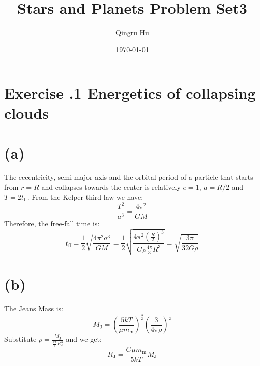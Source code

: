 \documentclass[a4paper,12pt]{article}
\title{\textbf{Stars and Planets Problem Set3}}
\author{Qingru Hu}
\date{\today}
\begin{document}
\maketitle
\section*{\textbf{Exercise \uppercase\expandafter{}.1  Energetics of collapsing clouds}}
\section*{(a)}
The eccentricity, semi-major axis and the orbital period of a particle that starts from $r=R$ and 
collapses towards the center is relatively $e=1$, $a=R/2$ and $T=2t_{\text{ff}}$. From the Kelper 
third law we have:
\begin{equation*}
    \frac{T^2}{a^3} = \frac{4\pi^2}{GM}
\end{equation*}
Therefore, the free-fall time is:
\begin{equation*}
    t_{\text{ff}} = \frac{1}{2} \sqrt{\frac{4\pi^2 a^3}{G M}} 
    = \frac{1}{2} \sqrt{\frac{4\pi^2 (\frac{R}{2})^3}{G \rho \frac{4\pi}{3} R^3}}
    = \sqrt{\frac{3\pi}{32 G\rho}}
\end{equation*}

\section*{(b)}
The Jeans Mass is:
\begin{equation*}
    M_\text{J} = (\frac{5kT}{\mu m_\text{m}})^{\frac{3}{2}} (\frac{3}{4\pi \rho})^{\frac{1}{2}}
\end{equation*}
Substitute $\rho = \frac{M_\text{J}}{\frac{4\pi}{3} R^3_\text{J}}$ and we get:
\begin{equation*}
    R_{\text{J}} = \frac{G\mu m_\text{m}}{5kT} M_\text{J}
\end{equation*}
\end{document}

